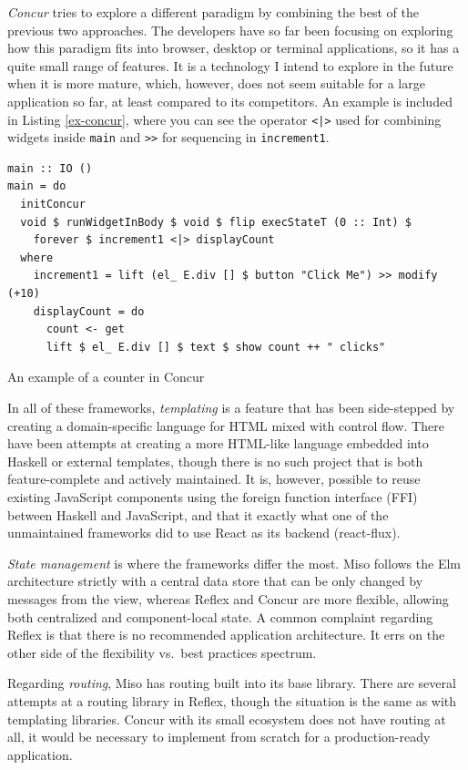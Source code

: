\documentclass[english,zadani,odsaz]{fitthesis}
\begin{document}
\emph{Concur} \cite{concur} tries to explore a different paradigm by combining the best
of the previous two approaches. The developers have so far been focusing on
exploring how this paradigm fits into browser, desktop or terminal applications,
so it has a quite small range of features. It is a technology I intend to
explore in the future when it is more mature, which, however, does not seem
suitable for a large application so far, at least compared to its
competitors. An example is included in Listing \ref{ex-concur}, where you can see the
operator \texttt{<|>} used for combining widgets inside \texttt{main} and \texttt{>>} for sequencing in
\texttt{increment1}.

\begin{listing}[tb]
\begin{verbatim}
main :: IO ()
main = do
  initConcur
  void $ runWidgetInBody $ void $ flip execStateT (0 :: Int) $
    forever $ increment1 <|> displayCount
  where
    increment1 = lift (el_ E.div [] $ button "Click Me") >> modify (+10)
    displayCount = do
      count <- get
      lift $ el_ E.div [] $ text $ show count ++ " clicks"
\end{verbatim}
\caption{An example of a counter in Concur \label{ex-concur}}
\end{listing}

In all of these frameworks, \emph{templating} is a feature that has been side-stepped
by creating a domain-specific language for HTML mixed with control flow. There
have been attempts at creating a more HTML-like language embedded into Haskell
or external templates, though there is no such project that is both
feature-complete and actively maintained. It is, however, possible to reuse
existing JavaScript components using the foreign function interface (FFI)
between Haskell and JavaScript, and that it exactly what one of the unmaintained
frameworks did to use React as its backend (react-flux).

\emph{State management} is where the frameworks differ the most. Miso follows the Elm
architecture strictly with a central data store that can be only changed by
messages from the view, whereas Reflex and Concur are more flexible, allowing
both centralized and component-local state. A common complaint regarding Reflex
is that there is no recommended application architecture. It errs on the other
side of the flexibility vs.~best practices spectrum.

Regarding \emph{routing}, Miso has routing built into its base library. There are several
attempts at a routing library in Reflex, though the situation is the same as
with templating libraries. Concur with its small ecosystem does not have routing
at all, it would be necessary to implement from scratch for a production-ready
application.
\end{document}
